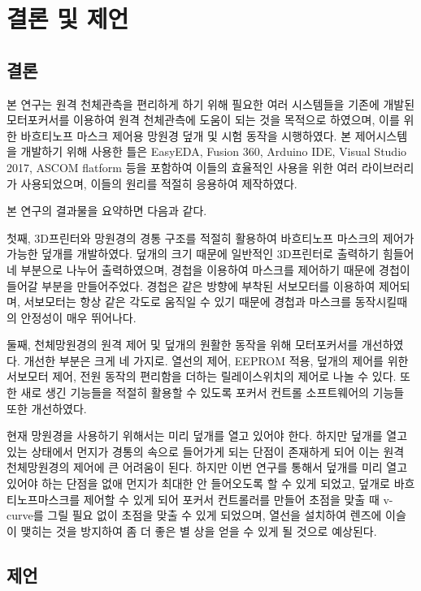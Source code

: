 \documentclass[twoside,11pt]{gshs_thesis}
\begin{document}
\section{결론 및 제언}
\subsection{결론}
  본 연구는 원격 천체관측을 편리하게 하기 위해 필요한 여러 시스템들을 기존에 개발된 모터포커서를 이용하여 원격 천체관측에 도움이 되는 것을 목적으로 하였으며, 이를 위한 바흐티노프 마스크 제어용 망원경 덮개 및 시험 동작을 시행하였다. 본 제어시스템을 개발하기 위해 사용한 틀은 EasyEDA, Fusion 360, Arduino IDE, Visual Studio 2017, ASCOM flatform 등을 포함하여 이들의 효율적인 사용을 위한 여러 라이브러리가 사용되었으며, 이들의 원리를 적절히 응용하여 제작하였다. 

본 연구의 결과물을 요약하면 다음과 같다.

 첫째, 3D프린터와 망원경의 경통 구조를 적절히 활용하여 바흐티노프 마스크의 제어가 가능한 덮개를 개발하였다. 덮개의 크기 때문에 일반적인 3D프린터로 출력하기 힘들어 네 부분으로 나누어 출력하였으며, 경첩을 이용하여 마스크를 제어하기 때문에 경첩이 들어갈 부분을 만들어주었다. 경첩은 같은 방향에 부착된 서보모터를 이용하여 제어되며, 서보모터는 항상 같은 각도로 움직일 수 있기 때문에 경첩과 마스크를 동작시킬때의 안정성이 매우 뛰어나다.
 
 둘째, 천체망원경의 원격 제어 및 덮개의 원활한 동작을 위해 모터포커서를 개선하였다. 개선한 부분은 크게 네 가지로. 열선의 제어, EEPROM 적용, 덮개의 제어를 위한 서보모터 제어, 전원 동작의 편리함을 더하는 릴레이스위치의 제어로 나놀 수 있다. 또한 새로 생긴 기능들을 적절히 활용할 수 있도록 포커서 컨트롤 소프트웨어의 기능들 또한 개선하였다.

 현재 망원경을 사용하기 위해서는 미리 덮개를 열고 있어야 한다. 하지만 덮개를 열고 있는 상태에서 먼지가 경통의 속으로 들어가게 되는 단점이 존재하게 되어 이는 원격 천체망원경의 제어에 큰 어려움이 된다. 하지만 이번 연구를 통해서 덮개를 미리 열고 있어야 하는 단점을 없애 먼지가 최대한 안 들어오도록 할 수 있게 되었고, 덮개로 바흐티노프마스크를 제어할 수 있게 되어 포커서 컨트롤러를 만들어 초점을 맞출 때 v-curve를 그릴 필요 없이 초점을 맞출 수 있게 되었으며, 열선을 설치하여 렌즈에 이슬이 맺히는 것을 방지하여 좀 더 좋은 별 상을 얻을 수 있게 될 것으로 예상된다.

\subsection{제언}
\end{document}
